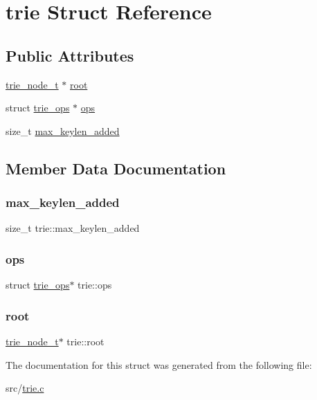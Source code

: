 \hypertarget{structtrie}{}\section{trie Struct Reference}
\label{structtrie}
\subsection*{Public Attributes}
\begin{DoxyCompactItemize}
\item 
\mbox{\hyperlink{trie_8c_a66fb0a48d7e7c08593e6f31b237dea80}{trie\+\_\+node\+\_\+t}} $\ast$ \mbox{\hyperlink{structtrie_ac6ad1ecfb194535ac3be0a6c43a16221}{root}}
\item 
struct \mbox{\hyperlink{structtrie__ops}{trie\+\_\+ops}} $\ast$ \mbox{\hyperlink{structtrie_a06e66563893e1fab35731eeb1522ea4a}{ops}}
\item 
size\+\_\+t \mbox{\hyperlink{structtrie_a32fe8ee6c9099ceca4ea003420eb5870}{max\+\_\+keylen\+\_\+added}}
\end{DoxyCompactItemize}


\subsection{Member Data Documentation}
\mbox{\label{structtrie_a32fe8ee6c9099ceca4ea003420eb5870}} 
\subsubsection{\texorpdfstring{max\_keylen\_added}{max\_keylen\_added}}
{\footnotesize\ttfamily size\+\_\+t trie\+::max\+\_\+keylen\+\_\+added}

\mbox{\label{structtrie_a06e66563893e1fab35731eeb1522ea4a}} 
\subsubsection{\texorpdfstring{ops}{ops}}
{\footnotesize\ttfamily struct \mbox{\hyperlink{structtrie__ops}{trie\+\_\+ops}}$\ast$ trie\+::ops}

\mbox{\label{structtrie_ac6ad1ecfb194535ac3be0a6c43a16221}} 
\subsubsection{\texorpdfstring{root}{root}}
{\footnotesize\ttfamily \mbox{\hyperlink{trie_8c_a66fb0a48d7e7c08593e6f31b237dea80}{trie\+\_\+node\+\_\+t}}$\ast$ trie\+::root}



The documentation for this struct was generated from the following file\+:\begin{DoxyCompactItemize}
\item 
src/\mbox{\hyperlink{trie_8c}{trie.\+c}}\end{DoxyCompactItemize}
